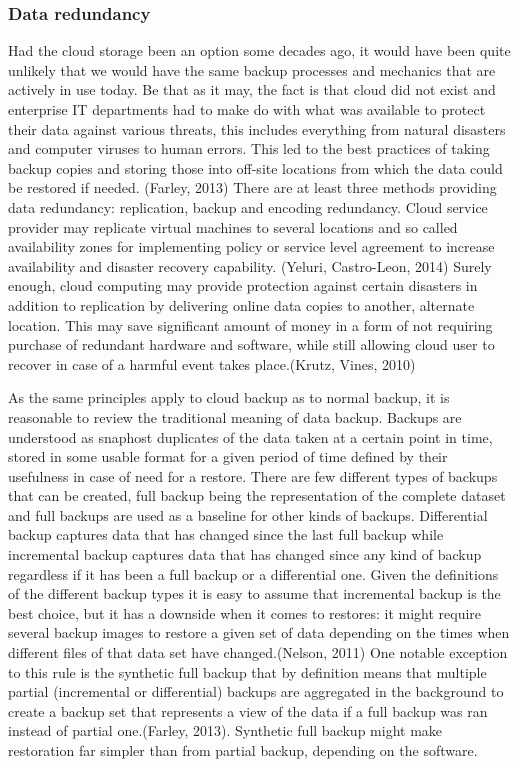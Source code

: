 \documentclass{article}
\begin{document}
\subsubsection{Data redundancy}
Had the cloud storage been an option some decades ago, it would have been quite unlikely that we would have the same backup processes and mechanics that are actively in use today. Be that as it may, the fact is that cloud did not exist and enterprise IT departments had to make do with what was available to protect their data against various threats, this includes everything from natural disasters and computer viruses to human errors. This led to the best practices of taking backup copies and storing those into off-site locations from which the data could be restored if needed. (Farley, 2013) 
There are at least three methods providing data redundancy: replication, backup and encoding redundancy. Cloud service provider may replicate virtual machines to several locations and so called availability zones for implementing policy or service level agreement to increase availability and disaster recovery capability. (Yeluri, Castro-Leon, 2014) Surely enough, cloud computing may provide protection against certain disasters in addition to replication by delivering online data copies to another, alternate location. This may save significant amount of money in a form of not requiring purchase of redundant hardware and software, while still allowing cloud user to recover in case of a harmful event takes place.(Krutz, Vines, 2010)
\par
As the same principles apply to cloud backup as to normal backup, it is reasonable to review the traditional meaning of data backup. Backups are understood as snaphost duplicates of the data taken at a certain point in time, stored in some usable format for a given period of time defined by their usefulness in case of need for a restore. There are few different types of backups that can be created, full backup being the representation of the complete dataset and full backups are used as a baseline for other kinds of backups. Differential backup captures data that has changed since the last full backup while incremental backup captures data that has changed since any kind of backup regardless if it has been a full backup or a differential one. Given the definitions of the different backup types it is easy to assume that incremental backup is the best choice, but it has a downside when it comes to restores: it might require several backup images to restore a given set of data depending on the times when different files of that data set have changed.(Nelson, 2011) One notable exception to this rule is the synthetic full backup that by definition means that multiple partial (incremental or differential) backups are aggregated in the background to create a backup set that represents a view of the data if a full backup was ran instead of partial one.(Farley, 2013). Synthetic full backup might make restoration far simpler than from partial backup, depending on the software.
\end{document}
